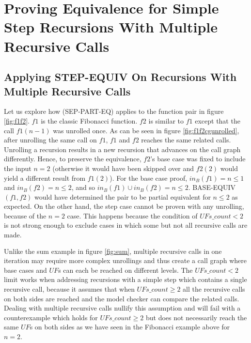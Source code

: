\section{Proving Equivalence for Simple Step Recursions With Multiple Recursive Calls}
\label{sec:newproof}
\subsection{Applying STEP-EQUIV On Recursions With Multiple Recursive Calls}
\label{sec:appstepmrc}

Let us explore how (SEP-PART-EQ) applies to the function pair in figure \ref{fig:f1f2}.
$f1$ is the classic Fibonacci function. $f2$ is similar to $f1$ except that the call  $f1(n-1)$ was unrolled once. As can be seen in figure \ref{fig:f1f2cgunrolled}, after unrolling the same call on $f1$, $f1$ and $f2$ reaches the same related calls. Unrolling a recursion results in a new recursion that advances on the call graph differently. Hence, to preserve the equivalence, $f2$'s base case was fixed to include the input $n=2$ (otherwise it would have been skipped over and $f2(2)$ would yield a different result from $f1(2)$). 
For the base case proof, $in_B(f1) = {n \leq 1}$ and  $in_B(f2) = {n \leq 2}$, and so $in_B(f1) \cup in_B(f2) = {n \leq 2} $. BASE-EQUIV$(f1,f2)$ would have determined the pair to be partial equivalent for ${n \leq 2}$ as expected. On the other hand, the step case cannot be proven with any unrolling, because of the $n=2$ case. This happens because the condition of $UFs\_count < 2$ is not strong enough to exclude cases in which some but not all recursive calls are made.

Unlike the sum example in figure \ref{fig:sum}, multiple recursive calls in one iteration may require more complex unrollings and thus create a call graph where base cases and $UF$s can each be reached on different levels. The $UFs\_count < 2$ limit works when addressing recursions with a simple step which contains a single recursive call, because it assumes that when $UFs\_count \geq 2$ all the recursive calls on both sides are reached and the model checker can compare the related calls. Dealing with multiple recursive calls nullify this assumption and will fail with a counterexample which holds for $UFs\_count \geq 2$ but does not necessarily reach the same $UF$s on both sides as we have seen in the Fibonacci example above for $n = 2$.


